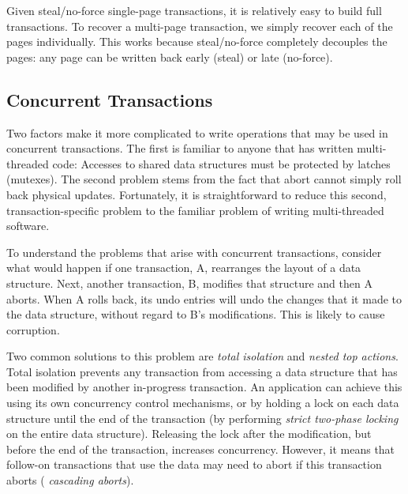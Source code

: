 \documentclass[letterpaper,twocolumn,10pt]{article}
\newcommand{\yads}{Stasis'\xspace}
\begin{document}
Given steal/no-force single-page transactions, it is relatively easy
to build full transactions. 
To recover a multi-page transaction, we simply recover each of
the pages individually.  This works because steal/no-force completely
decouples the pages: any page can be written back early (steal) or
late (no-force).  

\subsection{Concurrent Transactions}
\label{sec:nta}

Two factors make it more complicated to write operations that may be
used in concurrent transactions.  The first is familiar to anyone that
has written multi-threaded code: Accesses to shared data structures
must be protected by latches (mutexes).  The second problem stems from
the fact that abort cannot simply roll back physical updates.
Fortunately, it is straightforward to reduce this second,
transaction-specific problem to the familiar problem of writing
multi-threaded software. 


To understand the problems that arise with concurrent transactions,
consider what would happen if one transaction, A, rearranges the
layout of a data structure.  Next, another transaction, B,
modifies that structure and then A aborts.  When A rolls back, its
undo entries will undo the changes that it made to the data
structure, without regard to B's modifications.  This is likely to
cause corruption.

Two common solutions to this problem are {\em total isolation} and
{\em nested top actions}.  Total isolation prevents any
transaction from accessing a data structure that has been modified by
another in-progress transaction.  An application can achieve this
using its own concurrency control mechanisms, or by holding a lock on
each data structure until the end of the transaction (by performing {\em strict two-phase locking} on the entire data structure).  
Releasing the
lock after the modification, but before the end of the transaction,
increases concurrency.  However, it means that follow-on transactions that use
the data may need to abort if this transaction aborts ({\em
cascading aborts}). 
\end{document}
